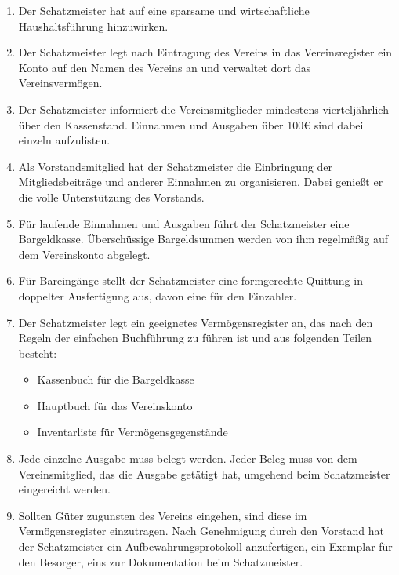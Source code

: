 \documentclass[fontsize=12pt,paper=a4,pagesize,headings=small]{scrartcl}
\begin{document}
\begin{enumerate}
    \item Der Schatzmeister hat auf eine sparsame und wirtschaftliche
        Haushaltsführung hinzuwirken.

    \item Der Schatzmeister legt nach Eintragung des Vereins in das
        Vereinsregister ein Konto auf den Namen des Vereins an und
        verwaltet dort das Vereinsvermögen.

    \item Der Schatzmeister informiert die Vereinsmitglieder
        mindestens vierteljährlich über den
        Kassenstand. Einnahmen und Ausgaben über 100\euro{} sind dabei
        einzeln aufzulisten.

    \item Als Vorstandsmitglied hat der Schatzmeister die Einbringung der
        Mitgliedsbeiträge und anderer Einnahmen zu organisieren. Dabei
        genießt er die volle Unterstützung des Vorstands.

    \item Für laufende Einnahmen und Ausgaben führt der Schatzmeister eine
        Bargeldkasse. Überschüssige Bargeldsummen werden von ihm regelmäßig
        auf dem Vereinskonto abgelegt.

    \item Für Bareingänge stellt der Schatzmeister eine formgerechte
        Quittung in doppelter Ausfertigung aus, davon eine für den Einzahler.

    \item Der Schatzmeister legt ein geeignetes Vermögensregister an, das
        nach den Regeln der einfachen Buchführung zu führen ist und aus
        folgenden Teilen besteht:
        \begin{itemize}
            \item Kassenbuch für die Bargeldkasse
            \item Hauptbuch für das Vereinskonto
            \item Inventarliste für Vermögensgegenstände
        \end{itemize}

    \item Jede einzelne Ausgabe muss belegt werden. Jeder Beleg muss von
        dem Vereinsmitglied, das die Ausgabe getätigt hat, umgehend beim
        Schatzmeister eingereicht werden.

    \item Sollten Güter zugunsten des Vereins eingehen, sind diese im
        Vermögensregister einzutragen. Nach Genehmigung durch den Vorstand hat
        der Schatzmeister ein Aufbewahrungsprotokoll anzufertigen, ein Exemplar
        für den Besorger, eins zur Dokumentation beim Schatzmeister.


\end{enumerate}
\end{document}
